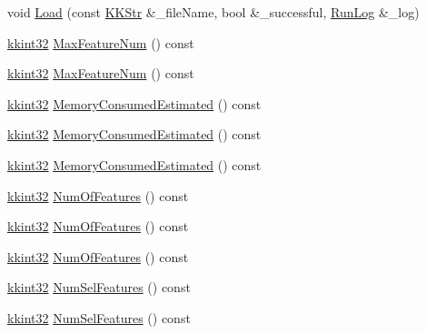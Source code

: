 \begin{DoxyCompactItemize}
\item 
void \hyperlink{class_k_k_m_l_l_1_1_feature_num_list_ab6cec164d20410bad22fa2b08573f4dc}{Load} (const \hyperlink{class_k_k_b_1_1_k_k_str}{K\+K\+Str} \&\+\_\+file\+Name, bool \&\+\_\+successful, \hyperlink{class_k_k_b_1_1_run_log}{Run\+Log} \&\+\_\+log)
\item 
\hyperlink{namespace_k_k_b_a8fa4952cc84fda1de4bec1fbdd8d5b1b}{kkint32} \hyperlink{class_k_k_m_l_l_1_1_feature_num_list_a2d8288d22d289bc3cf238da241dd5cf6}{Max\+Feature\+Num} () const 
\item 
\hyperlink{namespace_k_k_b_a8fa4952cc84fda1de4bec1fbdd8d5b1b}{kkint32} \hyperlink{class_k_k_m_l_l_1_1_feature_num_list_a2d8288d22d289bc3cf238da241dd5cf6}{Max\+Feature\+Num} () const 
\item 
\hyperlink{namespace_k_k_b_a8fa4952cc84fda1de4bec1fbdd8d5b1b}{kkint32} \hyperlink{class_k_k_m_l_l_1_1_feature_num_list_a9efe0d2ced65e384afbc196a915567b6}{Memory\+Consumed\+Estimated} () const 
\item 
\hyperlink{namespace_k_k_b_a8fa4952cc84fda1de4bec1fbdd8d5b1b}{kkint32} \hyperlink{class_k_k_m_l_l_1_1_feature_num_list_aea6c157b9eb442ff8f447eeaaa91fb82}{Memory\+Consumed\+Estimated} () const 
\item 
\hyperlink{namespace_k_k_b_a8fa4952cc84fda1de4bec1fbdd8d5b1b}{kkint32} \hyperlink{class_k_k_m_l_l_1_1_feature_num_list_aea6c157b9eb442ff8f447eeaaa91fb82}{Memory\+Consumed\+Estimated} () const 
\item 
\hyperlink{namespace_k_k_b_a8fa4952cc84fda1de4bec1fbdd8d5b1b}{kkint32} \hyperlink{class_k_k_m_l_l_1_1_feature_num_list_af2d974ca245a5d3c2bc88da0fe674493}{Num\+Of\+Features} () const 
\item 
\hyperlink{namespace_k_k_b_a8fa4952cc84fda1de4bec1fbdd8d5b1b}{kkint32} \hyperlink{class_k_k_m_l_l_1_1_feature_num_list_af2d974ca245a5d3c2bc88da0fe674493}{Num\+Of\+Features} () const 
\item 
\hyperlink{namespace_k_k_b_a8fa4952cc84fda1de4bec1fbdd8d5b1b}{kkint32} \hyperlink{class_k_k_m_l_l_1_1_feature_num_list_af2d974ca245a5d3c2bc88da0fe674493}{Num\+Of\+Features} () const 
\item 
\hyperlink{namespace_k_k_b_a8fa4952cc84fda1de4bec1fbdd8d5b1b}{kkint32} \hyperlink{class_k_k_m_l_l_1_1_feature_num_list_a1c1a2cb406970e8841e67cbc89c4871c}{Num\+Sel\+Features} () const 
\item 
\hyperlink{namespace_k_k_b_a8fa4952cc84fda1de4bec1fbdd8d5b1b}{kkint32} \hyperlink{class_k_k_m_l_l_1_1_feature_num_list_a1c1a2cb406970e8841e67cbc89c4871c}{Num\+Sel\+Features} () const 

\end{DoxyCompactItemize}
